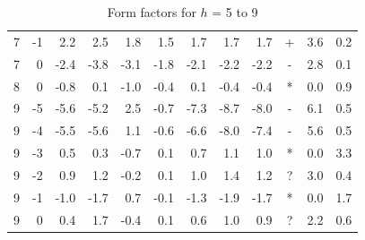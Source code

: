 \begin{table}[htbp]
\begin{tabular}{rrrrrrrrrcrr}
7 & -1 & 2.2 & 2.5 & 1.8 & 1.5 & 1.7 & 1.7 & 1.7 & + & 3.6 & 0.2 \\ 
7 & 0 & -2.4 & -3.8 & -3.1 & -1.8 & -2.1 & -2.2 & -2.2 & - & 2.8 & 0.1 \\ 
8 & 0 & -0.8 & 0.1 & -1.0 & -0.4 & 0.1 & -0.4 & -0.4 & * & 0.0 & 0.9 \\ 
9 & -5 & -5.6 & -5.2 & 2.5 & -0.7 & -7.3 & -8.7 & -8.0 & - & 6.1 & 0.5 \\ 
9 & -4 & -5.5 & -5.6 & 1.1 & -0.6 & -6.6 & -8.0 & -7.4 & - & 5.6 & 0.5 \\ 
9 & -3 & 0.5 & 0.3 & -0.7 & 0.1 & 0.7 & 1.1 & 1.0 & * & 0.0 & 3.3 \\ 
9 & -2 & 0.9 & 1.2 & -0.2 & 0.1 & 1.0 & 1.4 & 1.2 & ? & 3.0 & 0.4 \\ 
9 & -1 & -1.0 & -1.7 & 0.7 & -0.1 & -1.3 & -1.9 & -1.7 & * & 0.0 & 1.7 \\ 
9 & 0 & 0.4 & 1.7 & -0.4 & 0.1 & 0.6 & 1.0 & 0.9 & ? & 2.2 & 0.6 \\ 
\hline
\end{tabular}
\caption{Form factors for $h$ = 5 to 9}
\label{tab:LAXS_fits2}
\end{table}



\newpage
